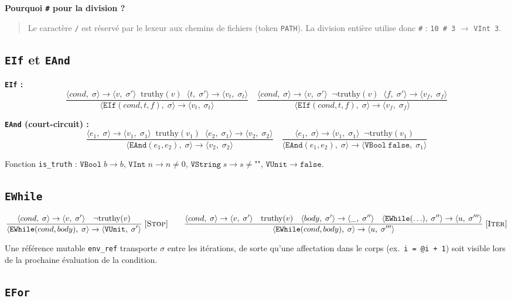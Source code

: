\documentclass[11pt,a4paper]{article}
\newcommand{\sem}[4]{%
  \langle #1,\;#2\rangle \rightarrow \langle #3,\;#4\rangle}
\newcommand{\irule}[2]{%
  \dfrac{\displaystyle #1}{\displaystyle #2}
}
\newcommand{\truthy}{\mathrm{truthy}}
\newcommand{\V}[1]{\mathtt{#1}}
\newenvironment{bloc}[1]
{
  \par\medskip
  \noindent\textbf{#1}
  \par
  \smallskip
  \begin{quote}
}
{
  \end{quote}
  \medskip
}
\begin{document}
\begin{bloc}{Pourquoi \texttt{\#} pour la division ?}
Le caractère \texttt{/} est réservé par le lexeur aux chemins de
fichiers (token \texttt{PATH}). La division entière utilise donc
\texttt{\#} : \texttt{10 \# 3} $\to$ \texttt{VInt 3}.
\end{bloc}

\subsection{\texttt{EIf} et \texttt{EAnd}}

\textbf{\texttt{EIf} :}
\[
\irule{
\sem{cond}{\sigma}{v}{\sigma'} \;\; \truthy(v) \;\;
\sem{t}{\sigma'}{v_t}{\sigma_t}
}{
\sem{\V{EIf}(cond,t,f)}{\sigma}{v_t}{\sigma_t}
}
\quad
\irule{
\sem{cond}{\sigma}{v}{\sigma'} \;\; \neg\truthy(v) \;\;
\sem{f}{\sigma'}{v_f}{\sigma_f}
}{
\sem{\V{EIf}(cond,t,f)}{\sigma}{v_f}{\sigma_f}
}
\]

\textbf{\texttt{EAnd} (court-circuit) :}
\[
\irule{
\sem{e_1}{\sigma}{v_1}{\sigma_1} \;\; \truthy(v_1) \;\;
\sem{e_2}{\sigma_1}{v_2}{\sigma_2}
}{
\sem{\V{EAnd}(e_1,e_2)}{\sigma}{v_2}{\sigma_2}
}
\quad
\irule{
\sem{e_1}{\sigma}{v_1}{\sigma_1} \;\; \neg\truthy(v_1)
}{
\sem{\V{EAnd}(e_1,e_2)}{\sigma}{\V{VBool\ false}}{\sigma_1}
}
\]

Fonction \texttt{is\_truth} :
$\V{VBool}\;b \to b$,\;
$\V{VInt}\;n \to n\neq 0$,\;
$\V{VString}\;s \to s\neq\texttt{""}$,\;
$\V{VUnit} \to \texttt{false}$.

\subsection{\texttt{EWhile}}

\[
\irule{
\sem{cond}{\sigma}{v}{\sigma'} \quad \neg\truthy(v)
}{
\sem{\V{EWhile}(cond,body)}{\sigma}{\V{VUnit}}{\sigma'}
}
\;\textsc{[Stop]}
\qquad
\irule{
\sem{cond}{\sigma}{v}{\sigma'} \quad \truthy(v)
\quad \sem{body}{\sigma'}{\_}{\sigma''}
\quad \sem{\V{EWhile}(\ldots)}{\sigma''}{u}{\sigma'''}
}{
\sem{\V{EWhile}(cond,body)}{\sigma}{u}{\sigma'''}
}
\;\textsc{[Iter]}
\]

Une référence mutable \texttt{env\_ref} transporte $\sigma$ entre les
itérations, de sorte qu'une affectation dans le corps (ex.\ \texttt{i = @i + 1})
soit visible lors de la prochaine évaluation de la condition.

\subsection{\texttt{EFor}}
\end{document}
